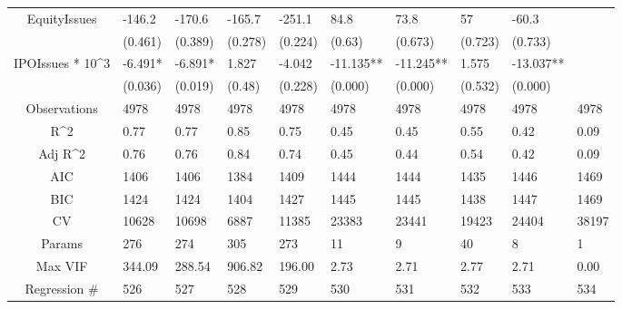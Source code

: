 \documentclass{article}
\begin{document}
\begin{table}[H]
\begin{tabular}{|clllllllll|}
  EquityIssues & -146.2 & -170.6 & -165.7 & -251.1 & 84.8 & 73.8 & 57 & -60.3 &  \\ 
   & (0.461) & (0.389) & (0.278) & (0.224) & (0.63) & (0.673) & (0.723) & (0.733) &  \\ 
  IPOIssues * 10^3 & -6.491* & -6.891* & 1.827 & -4.042 & -11.135** & -11.245** & 1.575 & -13.037** &  \\ 
   & (0.036) & (0.019) & (0.48) & (0.228) & (0.000) & (0.000) & (0.532) & (0.000) &  \\ 
  \hline 
 Observations & 4978 & 4978 & 4978 & 4978 & 4978 & 4978 & 4978 & 4978 & 4978 \\ 
  R^2 & 0.77 & 0.77 & 0.85 & 0.75 & 0.45 & 0.45 & 0.55 & 0.42 & 0.09 \\ 
  Adj R^2 & 0.76 & 0.76 & 0.84 & 0.74 & 0.45 & 0.44 & 0.54 & 0.42 & 0.09 \\ 
  AIC & 1406 & 1406 & 1384 & 1409 & 1444 & 1444 & 1435 & 1446 & 1469 \\ 
  BIC & 1424 & 1424 & 1404 & 1427 & 1445 & 1445 & 1438 & 1447 & 1469 \\ 
  CV & 10628 & 10698 & 6887 & 11385 & 23383 & 23441 & 19423 & 24404 & 38197 \\ 
  Params & 276 & 274 & 305 & 273 & 11 & 9 & 40 & 8 & 1 \\ 
  Max VIF & 344.09 & 288.54 & 906.82 & 196.00 & 2.73 & 2.71 & 2.77 & 2.71 & 0.00 \\ 
  Regression \# & 526 & 527 & 528 & 529 & 530 & 531 & 532 & 533 & 534 \\ 
   \hline
\end{tabular}
 
\end{table}
\end{document}

